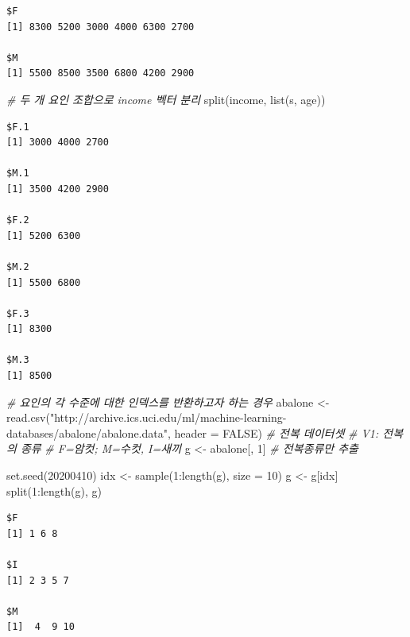 \documentclass[
  11pt,
]{krantz}
\newenvironment{Shaded}{\begin{snugshade}}{\end{snugshade}}
\newcommand{\AttributeTok}[1]{\textcolor[rgb]{0.61,0.61,0.61}{#1}}
\newcommand{\CommentTok}[1]{\textcolor[rgb]{0.37,0.37,0.37}{\textit{#1}}}
\newcommand{\ConstantTok}[1]{\textcolor[rgb]{0,0,0}{#1}}
\newcommand{\DecValTok}[1]{\textcolor[rgb]{0.06,0.06,0.06}{#1}}
\newcommand{\FunctionTok}[1]{\textcolor[rgb]{0,0,0}{#1}}
\newcommand{\NormalTok}[1]{#1}
\newcommand{\OtherTok}[1]{\textcolor[rgb]{0.37,0.37,0.37}{#1}}
\newcommand{\SpecialCharTok}[1]{\textcolor[rgb]{0,0,0}{#1}}
\newcommand{\StringTok}[1]{\textcolor[rgb]{0.5,0.5,0.5}{#1}}
\begin{document}
\begin{verbatim}
$F
[1] 8300 5200 3000 4000 6300 2700

$M
[1] 5500 8500 3500 6800 4200 2900
\end{verbatim}

\begin{Shaded}
\begin{Highlighting}[]
\CommentTok{\# 두 개 요인 조합으로 income 벡터 분리 }
\FunctionTok{split}\NormalTok{(income, }\FunctionTok{list}\NormalTok{(s, age))}
\end{Highlighting}
\end{Shaded}

\begin{verbatim}
$F.1
[1] 3000 4000 2700

$M.1
[1] 3500 4200 2900

$F.2
[1] 5200 6300

$M.2
[1] 5500 6800

$F.3
[1] 8300

$M.3
[1] 8500
\end{verbatim}

\begin{Shaded}
\begin{Highlighting}[]
\CommentTok{\# 요인의 각 수준에 대한 인덱스를 반환하고자 하는 경우}
\NormalTok{abalone }\OtherTok{\textless{}{-}} \FunctionTok{read.csv}\NormalTok{(}\StringTok{"http://archive.ics.uci.edu/ml/machine{-}learning{-}databases/abalone/abalone.data"}\NormalTok{, }
    \AttributeTok{header =} \ConstantTok{FALSE}\NormalTok{) }\CommentTok{\# 전복 데이터셋}
\CommentTok{\# V1: 전복의 종류}
\CommentTok{\# F=암컷; M=수컷, I=새끼}
\NormalTok{g }\OtherTok{\textless{}{-}}\NormalTok{ abalone[, }\DecValTok{1}\NormalTok{] }\CommentTok{\# 전복종류만 추출}

\FunctionTok{set.seed}\NormalTok{(}\DecValTok{20200410}\NormalTok{)}
\NormalTok{idx }\OtherTok{\textless{}{-}} \FunctionTok{sample}\NormalTok{(}\DecValTok{1}\SpecialCharTok{:}\FunctionTok{length}\NormalTok{(g), }\AttributeTok{size =} \DecValTok{10}\NormalTok{)}
\NormalTok{g }\OtherTok{\textless{}{-}}\NormalTok{ g[idx]}
\FunctionTok{split}\NormalTok{(}\DecValTok{1}\SpecialCharTok{:}\FunctionTok{length}\NormalTok{(g), g)}
\end{Highlighting}
\end{Shaded}

\begin{verbatim}
$F
[1] 1 6 8

$I
[1] 2 3 5 7

$M
[1]  4  9 10
\end{verbatim}
\end{document}
